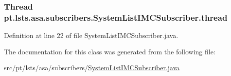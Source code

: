 \subsubsection[{thread}]{\setlength{\rightskip}{0pt plus 5cm}Thread pt.\+lsts.\+asa.\+subscribers.\+System\+List\+I\+M\+C\+Subscriber.\+thread\hspace{0.3cm}{\ttfamily [private]}}\label{classpt_1_1lsts_1_1asa_1_1subscribers_1_1SystemListIMCSubscriber_aada64c6435de6c7efc2504dcfc7a2a91}


Definition at line 22 of file System\+List\+I\+M\+C\+Subscriber.\+java.



The documentation for this class was generated from the following file\+:\begin{DoxyCompactItemize}
\item 
src/pt/lsts/asa/subscribers/\hyperlink{SystemListIMCSubscriber_8java}{System\+List\+I\+M\+C\+Subscriber.\+java}\end{DoxyCompactItemize}

